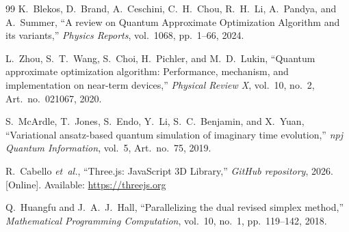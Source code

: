 \documentclass[11pt,a4paper]{article}
\theoremstyle{definition}
\theoremstyle{remark}
\begin{document}
\begin{thebibliography}{99}
K.~Blekos, D.~Brand, A.~Ceschini, C.~H.~Chou, R.~H.~Li, A.~Pandya, and A.~Summer, ``A review on Quantum Approximate Optimization Algorithm and its variants,'' \textit{Physics Reports}, vol.~1068, pp.~1--66, 2024.

L.~Zhou, S.~T.~Wang, S.~Choi, H.~Pichler, and M.~D.~Lukin, ``Quantum approximate optimization algorithm: Performance, mechanism, and implementation on near-term devices,'' \textit{Physical Review X}, vol.~10, no.~2, Art.~no.~021067, 2020.

S.~McArdle, T.~Jones, S.~Endo, Y.~Li, S.~C.~Benjamin, and X.~Yuan, ``Variational ansatz-based quantum simulation of imaginary time evolution,'' \textit{npj Quantum Information}, vol.~5, Art.~no.~75, 2019.

R.~Cabello \textit{et~al.}, ``Three.js: JavaScript 3D Library,'' \textit{GitHub repository}, 2026. [Online]. Available: \url{https://threejs.org}

Q.~Huangfu and J.~A.~J.~Hall, ``Parallelizing the dual revised simplex method,'' \textit{Mathematical Programming Computation}, vol.~10, no.~1, pp.~119--142, 2018.

\end{thebibliography}
\end{document}
